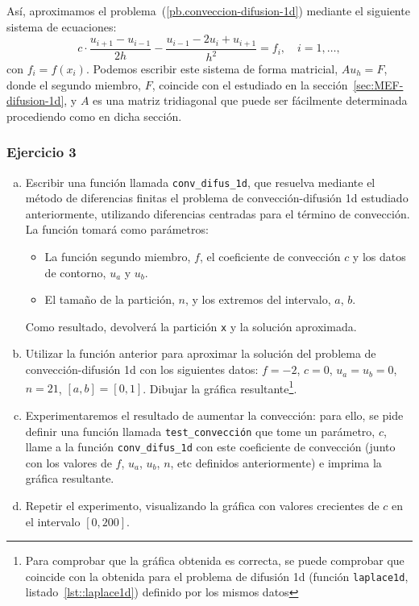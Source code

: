 \documentclass[11pt,spanish,a4wide]{article}
\begin{document}
Así, aproximamos el problema~(\ref{pb.conveccion-difusion-1d})
mediante el siguiente sistema de ecuaciones:
$$
c\cdot \frac{u_{i+1}-u_{i-1}}{2h} -\frac{u_{i-1}-2u_i + u_{i+1}}{h^2}
= f_i, \quad i=1,\dots,
$$
con $f_i=f(x_i)$. Podemos escribir este sistema de forma matricial,
$A u_h = F$, donde el segundo miembro, $F$, coincide con el estudiado en
la sección~\ref{sec:MEF-difusion-1d}, y $A$ es una matriz tridiagonal
que puede ser fácilmente determinada procediendo como en dicha
sección.

\subsubsection{Ejercicio 3}
\begin{enumerate}[a)]
\item Escribir una función llamada \texttt{conv\_difus\_1d}, que
  resuelva mediante el método de diferencias finitas el problema de
  convección-difusión 1d estudiado anteriormente, utilizando
  diferencias centradas para el término de convección. La función tomará
  como parámetros:
  \begin{itemize}
  \item La función segundo miembro, $f$, el coeficiente de convección
    $c$ y los datos de contorno, $u_a$ y $u_b$.
  \item El tamaño de la partición, $n$, y los extremos del intervalo,
    $a$, $b$.
  \end{itemize}
  Como resultado, devolverá la partición \texttt{x} y la solución
  aproximada.
\item Utilizar la función anterior para aproximar la solución del
  problema de convección-difusión 1d con los siguientes datos: $f=-2$,
  $c=0$, $u_a=u_b=0$, $n=21$, $[a,b]=[0,1]$. Dibujar la gráfica
  resultante\footnote{Para comprobar que la gráfica obtenida es
    correcta, se puede comprobar que coincide con la obtenida para el
    problema de difusión 1d (función \texttt{laplace1d},
    listado~\ref{lst::laplace1d}) definido por los mismos datos}.
\item Experimentaremos el resultado de aumentar la convección: para
  ello, se pide definir una función llamada \texttt{test\_convección}
  que tome un parámetro, $c$, llame a la función
  \texttt{conv\_difus\_1d} con este coeficiente de convección (junto
  con los valores de $f$, $u_a$, $u_b$, $n$, etc definidos
  anteriormente) e imprima la gráfica resultante.
\item Repetir el experimento, visualizando la gráfica con valores
  crecientes de $c$ en el intervalo $[0,200]$.


\end{enumerate}
\end{document}
